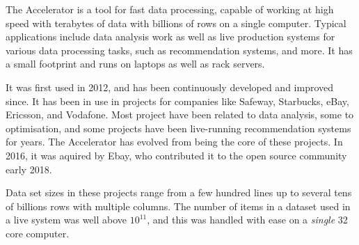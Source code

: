
The Accelerator is a tool for fast data processing, capable of working
at high speed with terabytes of data with billions of rows on a single
computer.  Typical applications include data analysis work as well as
live production systems for various data processing tasks, such as
recommendation systems, and more.  It has a small footprint and runs
on laptops as well as rack servers.

It was first used in 2012, and has been continuously developed and
improved since.  It has been in use in projects for companies like
Safeway, Starbucks, eBay, Ericsson, and Vodafone.  Most project have
been related to data analysis, some to optimisation, and some projects
have been live-running recommendation systems for years.  The
Accelerator has evolved from being the core of these projects.  In
2016, it was aquired by Ebay, who contributed it to the open source
community early 2018.

Data set sizes in these projects range from a few hundred lines up to
several tens of billions rows with multiple columns.  The number of
items in a dataset used in a live system was well above $10^{11}$, and
this was handled with ease on a \emph{single} 32 core computer.

